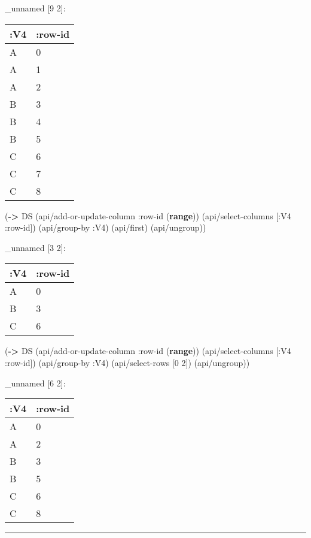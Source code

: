 \documentclass[]{article}
\newenvironment{Shaded}{\begin{snugshade}}{\end{snugshade}}
\newcommand{\KeywordTok}[1]{\textcolor[rgb]{0.13,0.29,0.53}{\textbf{#1}}}
\newcommand{\DecValTok}[1]{\textcolor[rgb]{0.00,0.00,0.81}{#1}}
\newcommand{\AttributeTok}[1]{\textcolor[rgb]{0.77,0.63,0.00}{#1}}
\newcommand{\NormalTok}[1]{#1}
\begin{document}
\_unnamed {[}9 2{]}:

\begin{longtable}[]{@{}ll@{}}
\toprule
:V4 & :row-id\tabularnewline
\midrule
\endhead
A & 0\tabularnewline
A & 1\tabularnewline
A & 2\tabularnewline
B & 3\tabularnewline
B & 4\tabularnewline
B & 5\tabularnewline
C & 6\tabularnewline
C & 7\tabularnewline
C & 8\tabularnewline
\bottomrule
\end{longtable}

\begin{Shaded}
\begin{Highlighting}[]
\NormalTok{(}\KeywordTok{->}\NormalTok{ DS}
\NormalTok{    (api/add-or-update-column }\AttributeTok{:row-id}\NormalTok{ (}\KeywordTok{range}\NormalTok{))}
\NormalTok{    (api/select-columns [}\AttributeTok{:V4} \AttributeTok{:row-id}\NormalTok{])}
\NormalTok{    (api/group-by }\AttributeTok{:V4}\NormalTok{)}
\NormalTok{    (api/first)}
\NormalTok{    (api/ungroup))}
\end{Highlighting}
\end{Shaded}

\_unnamed {[}3 2{]}:

\begin{longtable}[]{@{}ll@{}}
\toprule
:V4 & :row-id\tabularnewline
\midrule
\endhead
A & 0\tabularnewline
B & 3\tabularnewline
C & 6\tabularnewline
\bottomrule
\end{longtable}

\begin{Shaded}
\begin{Highlighting}[]
\NormalTok{(}\KeywordTok{->}\NormalTok{ DS}
\NormalTok{    (api/add-or-update-column }\AttributeTok{:row-id}\NormalTok{ (}\KeywordTok{range}\NormalTok{))}
\NormalTok{    (api/select-columns [}\AttributeTok{:V4} \AttributeTok{:row-id}\NormalTok{])}
\NormalTok{    (api/group-by }\AttributeTok{:V4}\NormalTok{)}
\NormalTok{    (api/select-rows [}\DecValTok{0} \DecValTok{2}\NormalTok{])}
\NormalTok{    (api/ungroup))}
\end{Highlighting}
\end{Shaded}

\_unnamed {[}6 2{]}:

\begin{longtable}[]{@{}ll@{}}
\toprule
:V4 & :row-id\tabularnewline
\midrule
\endhead
A & 0\tabularnewline
A & 2\tabularnewline
B & 3\tabularnewline
B & 5\tabularnewline
C & 6\tabularnewline
C & 8\tabularnewline
\bottomrule
\end{longtable}

\begin{center}\rule{0.5\linewidth}{0.5pt}\end{center}
\end{document}
